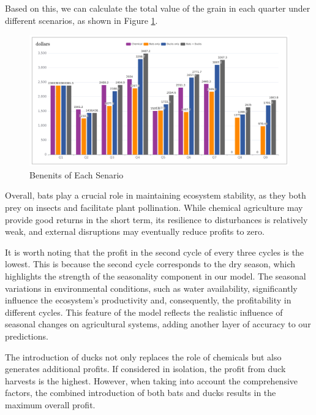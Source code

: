 \documentclass{HZNUMCM}
\begin{document}
        Based on this, we can calculate the total value of the grain in each quarter under different scenarios, 
        as shown in Figure \ref{fig:Benefits}.
        \begin{figure}
          \centering
          \includegraphics[width=\linewidth]{images/benefits_processed.png}
          \caption{Benenits of Each Senario}
          \label{fig:Benefits}
        \end{figure}
        Overall, bats play a crucial role in maintaining ecosystem stability, 
        as they both prey on insects and facilitate plant pollination. 
        While chemical agriculture may provide good returns in the short term, 
        its resilience to disturbances is relatively weak, 
        and external disruptions may eventually reduce profits to zero. 

        It is worth noting that the profit in the second cycle of every three cycles is the lowest. This is because the second cycle corresponds to the dry season, which highlights the strength of the seasonality component in our model. The seasonal variations in environmental conditions, such as water availability, significantly influence the ecosystem's productivity and, consequently, the profitability in different cycles. This feature of the model reflects the realistic influence of seasonal changes on agricultural systems, adding another layer of accuracy to our predictions.

        The introduction of ducks not only replaces the role of chemicals but also generates additional profits. 
        If considered in isolation, the profit from duck harvests is the highest. 
        However, when taking into account the comprehensive factors, 
        the combined introduction of both bats and ducks results in the maximum overall profit.
\end{document}
